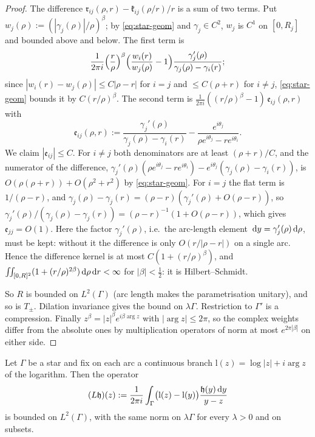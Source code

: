 \begin{proof}
The difference $\mathfrak r_{ij}(\rho,r)-\mathfrak k_{ij}(\rho/r)/r$ is a sum of two terms. Put
$w_j(\rho):=(|\gamma_j(\rho)|/\rho)^\beta$; by \eqref{eq:star-geom} and $\gamma_j\in C^2$, $w_j$ is $C^1$ on $[0,R_j]$ and
bounded above and below. The first term is
\[
  \frac1{2\pi i}\Bigl(\frac r\rho\Bigr)^\beta\Bigl(\frac{w_i(r)}{w_j(\rho)}-1\Bigr)\frac{\gamma_j'(\rho)}{\gamma_j(\rho)-\gamma_i(r)};
\]
since $|w_i(r)-w_j(\rho)|\le C|\rho-r|$ for $i=j$ and $\le C(\rho+r)$ for $i\ne j$, \eqref{eq:star-geom} bounds it by
$C(r/\rho)^\beta$. The second term is $\frac1{2\pi i}((r/\rho)^\beta-1)\,\mathfrak e_{ij}(\rho,r)$ with
\[
  \mathfrak e_{ij}(\rho,r):=\frac{\gamma_j'(\rho)}{\gamma_j(\rho)-\gamma_i(r)}-\frac{e^{i\theta_j}}{\rho e^{i\theta_j}-re^{i\theta_i}} .
\]
We claim $|\mathfrak e_{ij}|\le C$. For $i\ne j$ both denominators are at least $(\rho+r)/C$, and the numerator of the
difference, $\gamma_j'(\rho)(\rho e^{i\theta_j}-re^{i\theta_i})-e^{i\theta_j}(\gamma_j(\rho)-\gamma_i(r))$, is
$O(\rho(\rho+r))+O(\rho^2+r^2)$ by \eqref{eq:star-geom}. For $i=j$ the flat term is $1/(\rho-r)$, and
$\gamma_j(\rho)-\gamma_j(r)=(\rho-r)(\gamma_j'(\rho)+O(\rho-r))$, so $\gamma_j'(\rho)/(\gamma_j(\rho)-\gamma_j(r))=
(\rho-r)^{-1}(1+O(\rho-r))$, which gives $\mathfrak e_{jj}=O(1)$. Here the factor $\gamma_j'(\rho)$, i.e.\ the arc-length
element $\,\mathrm{d} y=\gamma_j'(\rho)\,\mathrm{d}\rho$, must be kept: without it the difference is only $O(r/|\rho-r|)$ on a single
arc. Hence the difference kernel is at most $C(1+(r/\rho)^\beta)$, and
$\iint_{[0,R]^2}(1+(r/\rho)^{2\beta})\,\mathrm{d}\rho\,\mathrm{d} r<\infty$ for $|\beta|<\frac12$: it is Hilbert--Schmidt.

So $R$ is bounded on $L^2(\Gamma)$ (arc length makes the parametrisation unitary), and so is $T_\pm$. Dilation invariance
gives the bound on $\lambda\Gamma$. Restriction to $\Gamma'$ is a compression. Finally $z^\beta=|z|^\beta e^{i\beta\arg z}$
with $|\arg z|\le2\pi$, so the complex weights differ from the absolute ones by multiplication operators of norm at most
$e^{2\pi|\beta|}$ on either side.
\end{proof}

\begin{lemma}\label{lem:star-log}
Let $\Gamma$ be a star and fix on each arc a continuous branch $\mathrm{l}(z)=\log|z|+i\arg z$ of the logarithm. Then the
operator
\[
  (L\mathfrak h)(z):=\frac1{2\pi i}\int_\Gamma\bigl(\mathrm l(z)-\mathrm l(y)\bigr)\frac{\mathfrak h(y)\,\mathrm{d} y}{y-z}
\]
is bounded on $L^2(\Gamma)$, with the same norm on $\lambda\Gamma$ for every $\lambda>0$ and on subsets.
\end{lemma}

